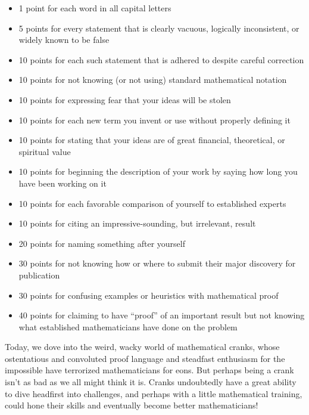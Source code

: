 \documentclass{article}
\begin{document}
\begin{itemize}
    \item 1 point for each word in all capital letters
    \item 5 points for every statement that is clearly vacuous, logically inconsistent, or widely known to be false
    \item 10 points for each such statement that is adhered to despite careful correction
    \item 10 points for not knowing (or not using) standard mathematical notation
    \item 10 points for expressing fear that your ideas will be stolen
    \item 10 points for each new term you invent or use without properly defining it
    \item 10 points for stating that your ideas are of great financial, theoretical, or spiritual value
    \item 10 points for beginning the description of your work by saying how long you have been working on it
    \item 10 points for each favorable comparison of yourself to established experts
    \item 10 points for citing an impressive-sounding, but irrelevant, result
    \item 20 points for naming something after yourself
    \item 30 points for not knowing how or where to submit their major discovery for publication
    \item 30 points for confusing examples or heuristics with mathematical proof
    \item 40 points for claiming to have  “proof” of an important result but not knowing what established mathematicians have done on the problem
\end{itemize}
	
Today, we dove into the weird, wacky world of mathematical cranks, whose ostentatious and convoluted proof language and steadfast enthusiasm for the impossible have terrorized mathematicians for eons. But perhaps being a crank isn’t as bad as we all might think it is. Cranks undoubtedly have a great ability to dive headfirst into challenges, and perhaps with a little mathematical training, could hone their skills and eventually become better mathematicians!
\end{document}
